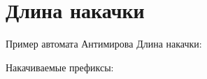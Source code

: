 \section{Длина накачки}
\begin{frame}{Пример автомата Антимирова}
    \vspace{-5pt}
	Длина накачки:

    Накачиваемые префиксы:
    
\end{frame}